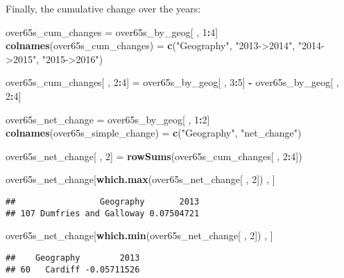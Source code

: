 \documentclass[]{article}
\newenvironment{Shaded}{\begin{snugshade}}{\end{snugshade}}
\newcommand{\KeywordTok}[1]{\textcolor[rgb]{0.13,0.29,0.53}{\textbf{#1}}}
\newcommand{\DecValTok}[1]{\textcolor[rgb]{0.00,0.00,0.81}{#1}}
\newcommand{\StringTok}[1]{\textcolor[rgb]{0.31,0.60,0.02}{#1}}
\newcommand{\OperatorTok}[1]{\textcolor[rgb]{0.81,0.36,0.00}{\textbf{#1}}}
\newcommand{\NormalTok}[1]{#1}
\begin{document}
Finally, the cumulative change over the years:

\begin{Shaded}
\begin{Highlighting}[]
\NormalTok{over65s_cum_changes =}\StringTok{ }\NormalTok{over65s_by_geog[ , }\DecValTok{1}\OperatorTok{:}\DecValTok{4}\NormalTok{]}
\KeywordTok{colnames}\NormalTok{(over65s_cum_changes) =}\StringTok{ }\KeywordTok{c}\NormalTok{(}\StringTok{"Geography"}\NormalTok{, }\StringTok{"2013->2014"}\NormalTok{,}
                                    \StringTok{"2014->2015"}\NormalTok{, }\StringTok{"2015->2016"}\NormalTok{)}

\NormalTok{over65s_cum_changes[ , }\DecValTok{2}\OperatorTok{:}\DecValTok{4}\NormalTok{] =}\StringTok{ }\NormalTok{over65s_by_geog[ , }\DecValTok{3}\OperatorTok{:}\DecValTok{5}\NormalTok{] }\OperatorTok{-}\StringTok{ }\NormalTok{over65s_by_geog[ , }\DecValTok{2}\OperatorTok{:}\DecValTok{4}\NormalTok{]}

\NormalTok{over65s_net_change =}\StringTok{ }\NormalTok{over65s_by_geog[ , }\DecValTok{1}\OperatorTok{:}\DecValTok{2}\NormalTok{]}
\KeywordTok{colnames}\NormalTok{(over65s_simple_change) =}\StringTok{ }\KeywordTok{c}\NormalTok{(}\StringTok{"Geography"}\NormalTok{, }\StringTok{"net_change"}\NormalTok{)}

\NormalTok{over65s_net_change[ , }\DecValTok{2}\NormalTok{] =}\StringTok{ }\KeywordTok{rowSums}\NormalTok{(over65s_cum_changes[ , }\DecValTok{2}\OperatorTok{:}\DecValTok{4}\NormalTok{])}

\NormalTok{over65s_net_change[}\KeywordTok{which.max}\NormalTok{(over65s_net_change[ , }\DecValTok{2}\NormalTok{]) , ]}
\end{Highlighting}
\end{Shaded}

\begin{verbatim}
##                 Geography       2013
## 107 Dumfries and Galloway 0.07504721
\end{verbatim}

\begin{Shaded}
\begin{Highlighting}[]
\NormalTok{over65s_net_change[}\KeywordTok{which.min}\NormalTok{(over65s_net_change[ , }\DecValTok{2}\NormalTok{]) , ]}
\end{Highlighting}
\end{Shaded}

\begin{verbatim}
##    Geography        2013
## 60   Cardiff -0.05711526
\end{verbatim}
\end{document}
